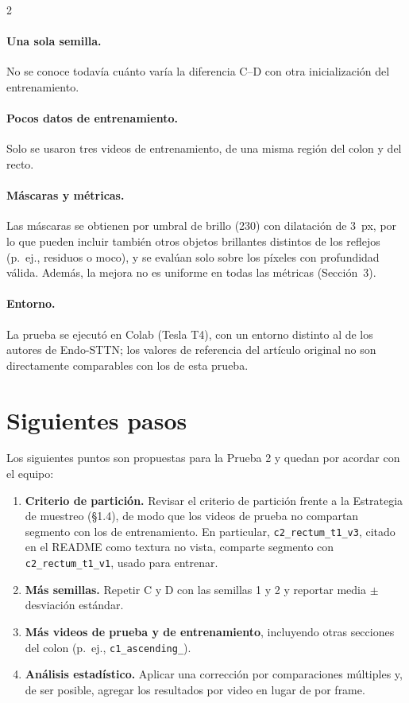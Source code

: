 \documentclass[11pt,letterpaper]{article}
\begin{document}
\begin{multicols}{2}
\paragraph{Una sola semilla.} No se conoce todavía cuánto varía la diferencia C--D con otra inicialización del entrenamiento.

\paragraph{Pocos datos de entrenamiento.} Solo se usaron tres videos de entrenamiento, de una misma región del colon y del recto.

\paragraph{Máscaras y métricas.} Las máscaras se obtienen por umbral de brillo (230) con dilatación de 3~px, por lo que pueden incluir también otros objetos brillantes distintos de los reflejos (p.~ej., residuos o moco), y se evalúan solo sobre los píxeles con profundidad válida. Además, la mejora no es uniforme en todas las métricas (Sección~3).

\paragraph{Entorno.} La prueba se ejecutó en Colab (Tesla T4), con un entorno distinto al de los autores de Endo-STTN; los valores de referencia del artículo original no son directamente comparables con los de esta prueba.

\section{Siguientes pasos}

Los siguientes puntos son propuestas para la Prueba 2 y quedan por acordar con el equipo:

\begin{enumerate}
\item \textbf{Criterio de partición.} Revisar el criterio de partición frente a la Estrategia de muestreo (\S1.4), de modo que los videos de prueba no compartan segmento con los de entrenamiento. En particular, \texttt{c2\_\allowbreak rectum\_\allowbreak t1\_\allowbreak v3}, citado en el README como textura no vista, comparte segmento con \texttt{c2\_\allowbreak rectum\_\allowbreak t1\_\allowbreak v1}, usado para entrenar.
\item \textbf{Más semillas.} Repetir C y D con las semillas 1 y 2 y reportar media $\pm$ desviación estándar.
\item \textbf{Más videos de prueba y de entrenamiento}, incluyendo otras secciones del colon (p.~ej., \texttt{c1\_\allowbreak ascending\_\allowbreak *}).
\item \textbf{Análisis estadístico.} Aplicar una corrección por comparaciones múltiples y, de ser posible, agregar los resultados por video en lugar de por frame.
\end{enumerate}


\end{multicols}
\end{document}
